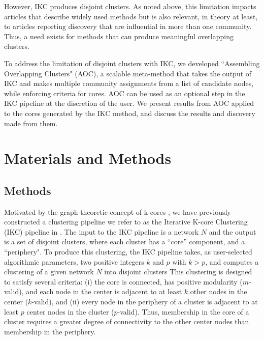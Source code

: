 \documentclass[12pt, oneside]{article}   	%
\begin{document}
However, IKC produces disjoint clusters. As noted above, this limitation impacts articles that describe widely used methods but is also relevant, in theory at least, to articles reporting discovery that are influential in more than one community.  Thus, a need exists for methods that can produce meaningful overlapping clusters. 
	
To address the limitation of disjoint clusters with IKC, we developed  ``Assembling Overlapping Clusters" (AOC), a scalable meta-method that takes the output of IKC and makes multiple community assignments from a list of candidate nodes, while enforcing criteria for cores. AOC can be used as an optional step in the IKC pipeline at the discretion of the user. We present results from AOC applied to the cores generated by the IKC method, and discuss the results and discovery made from them. 


\section{Materials and Methods}
	
\subsection{Methods} Motivated by the graph-theoretic concept of k-cores \citep{Giatsidis2011,malliaros2019}, we have previously constructed a clustering pipeline we refer to as  the Iterative K-core Clustering (IKC) pipeline in \cite{Wedell2022}. The input to the IKC pipeline is a network $N$ and the output is a set of disjoint clusters, where each cluster has a ``core'' component, and a ``periphery".  To produce this clustering,
the IKC pipeline takes, as user-selected algorithmic parameters, two positive integers $k$ and $p$ with $k > p$, and computes a clustering of a given network $N$ into disjoint clusters 
This clustering is designed to satisfy several criteria: (i) the core is connected,  has positive modularity ($m$-valid), and each node in the center  is adjacent to at least $k$ other nodes in the center ($k$-valid), and (ii) every node in the periphery of a cluster is adjacent to at least $p$ center nodes in the cluster ($p$-valid). Thus, membership in the core of a cluster requires a greater degree of connectivity to the other center nodes than membership in the periphery. 
\end{document}
